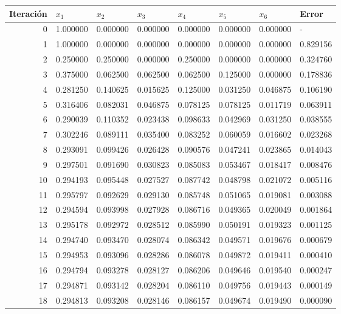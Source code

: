 \begin{table}[h]
    \centering
    \begin{tabular}{r|llllll|l}
        Iteración & $x_1$ &    $x_2$  &     $x_3$  &     $x_4$  &     $x_5$  &     $x_6$  &     Error \\
        \hline
         0  &  1.000000  &  0.000000  &  0.000000  &  0.000000  &  0.000000  &  0.000000  &  -        \\
         1  &  1.000000  &  0.000000  &  0.000000  &  0.000000  &  0.000000  &  0.000000  &  0.829156 \\
         2  &  0.250000  &  0.250000  &  0.000000  &  0.250000  &  0.000000  &  0.000000  &  0.324760 \\
         3  &  0.375000  &  0.062500  &  0.062500  &  0.062500  &  0.125000  &  0.000000  &  0.178836 \\
         4  &  0.281250  &  0.140625  &  0.015625  &  0.125000  &  0.031250  &  0.046875  &  0.106190 \\
         5  &  0.316406  &  0.082031  &  0.046875  &  0.078125  &  0.078125  &  0.011719  &  0.063911 \\
         6  &  0.290039  &  0.110352  &  0.023438  &  0.098633  &  0.042969  &  0.031250  &  0.038555 \\
         7  &  0.302246  &  0.089111  &  0.035400  &  0.083252  &  0.060059  &  0.016602  &  0.023268 \\
         8  &  0.293091  &  0.099426  &  0.026428  &  0.090576  &  0.047241  &  0.023865  &  0.014043 \\
         9  &  0.297501  &  0.091690  &  0.030823  &  0.085083  &  0.053467  &  0.018417  &  0.008476 \\
        10  &  0.294193  &  0.095448  &  0.027527  &  0.087742  &  0.048798  &  0.021072  &  0.005116 \\
        11  &  0.295797  &  0.092629  &  0.029130  &  0.085748  &  0.051065  &  0.019081  &  0.003088 \\
        12  &  0.294594  &  0.093998  &  0.027928  &  0.086716  &  0.049365  &  0.020049  &  0.001864 \\
        13  &  0.295178  &  0.092972  &  0.028512  &  0.085990  &  0.050191  &  0.019323  &  0.001125 \\
        14  &  0.294740  &  0.093470  &  0.028074  &  0.086342  &  0.049571  &  0.019676  &  0.000679 \\
        15  &  0.294953  &  0.093096  &  0.028286  &  0.086078  &  0.049872  &  0.019411  &  0.000410 \\
        16  &  0.294794  &  0.093278  &  0.028127  &  0.086206  &  0.049646  &  0.019540  &  0.000247 \\
        17  &  0.294871  &  0.093142  &  0.028204  &  0.086110  &  0.049756  &  0.019443  &  0.000149 \\
        18  &  0.294813  &  0.093208  &  0.028146  &  0.086157  &  0.049674  &  0.019490  &  0.000090
    \end{tabular}
\end{table}

